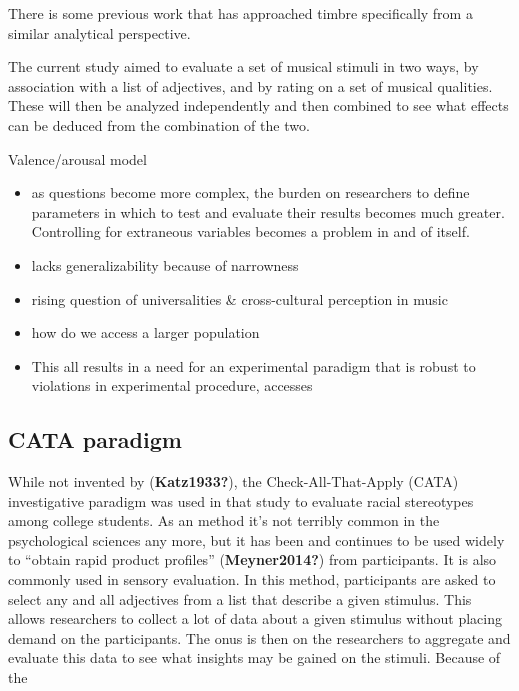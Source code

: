 \documentclass[
  english,
  man]{apa6}
\begin{document}
There is some previous work that has approached timbre specifically from a similar analytical perspective.

The current study aimed to evaluate a set of musical stimuli in two ways, by association with a list of adjectives, and by rating on a set of musical qualities. These will then be analyzed independently and then combined to see what effects can be deduced from the combination of the two.

Valence/arousal model

\begin{itemize}
\item
  as questions become more complex, the burden on researchers to define parameters in which to test and evaluate their results becomes much greater. Controlling for extraneous variables becomes a problem in and of itself.
\item
  lacks generalizability because of narrowness
\item
  rising question of universalities \& cross-cultural perception in music
\item
  how do we access a larger population
\item
  This all results in a need for an experimental paradigm that is robust to violations in experimental procedure, accesses
\end{itemize}

\hypertarget{cata-paradigm}{%
\subsection{CATA paradigm}\label{cata-paradigm}}

While not invented by (\textbf{Katz1933?}), the Check-All-That-Apply (CATA) investigative paradigm was used in that study to evaluate racial stereotypes among college students. As an method it's not terribly common in the psychological sciences any more, but it has been and continues to be used widely to ``obtain rapid product profiles'' (\textbf{Meyner2014?}) from participants. It is also commonly used in sensory evaluation. In this method, participants are asked to select any and all adjectives from a list that describe a given stimulus. This allows researchers to collect a lot of data about a given stimulus without placing demand on the participants. The onus is then on the researchers to aggregate and evaluate this data to see what insights may be gained on the stimuli. Because of the
\end{document}
